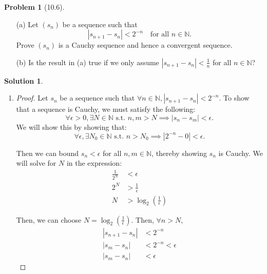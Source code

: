 \documentclass[12pt]{article}
\theoremstyle{definition} %
\newtheorem{solution}{Solution}
\newtheorem{problem}{Problem}
\theoremstyle{plain} %
\begin{document}


\begin{problem}[10.6]
    \begin{itemize}
        \item[(a)] Let $(s_n)$ be a sequence such that
        \[
        |s_{n+1} - s_n| < 2^{-n} \quad \text{for all } n \in \mathbb{N}.
        \]
        Prove $(s_n)$ is a Cauchy sequence and hence a convergent sequence.
        \item[(b)] Is the result in (a) true if we only assume $|s_{n+1} - s_n| < \frac{1}{n}$ for all $n \in \mathbb{N}$?
    \end{itemize}


\end{problem}

\begin{solution}
    \begin{enumerate}
        \item \begin{proof}
            Let \(s_n\) be a sequence such that \(\forall n \in \mathbb{N}, |s_{n+1} - s_n| < 2^{-n}\). To show that a sequence is Cauchy, we must satisfy the following: 
            \[
            \forall \epsilon > 0, \exists N \in \mathbb{N} \text{ s.t. } n, m > N \implies |s_n - s_m| < \epsilon.
            \]
            We will show this by showing that:
            \[
            \forall \epsilon, \exists N_0 \in \mathbb{N} \text{ s.t. } n > N_0 \implies |2^{-n} - 0| < \epsilon.
            \]
        
            Then we can bound \(s_n < \epsilon\) for all \(n, m \in \mathbb{N}\), thereby showing \(s_n\) is Cauchy. We will solve for \(N\) in the expression:
            \begin{align}
                \frac{1}{2^N} &< \epsilon \tag{34} \\
                2^N &> \frac{1}{\epsilon} \tag{35} \\
                N &> \log_2 \left( \frac{1}{\epsilon} \right) \tag{36}
            \end{align}
        
            Then, we can choose \(N = \log_2 \left( \frac{1}{\epsilon} \right)\). Then, \(\forall n > N\),
            \begin{align}
                |s_{n+1} - s_n| &< 2^{-n} \tag{37} \\
                |s_m - s_n| &< 2^{-n} < \epsilon \tag{38} \\
                |s_m - s_n| &< \epsilon \tag{39}
            \end{align}
        

\end{proof}
\end{enumerate}
\end{solution}
\end{document}
